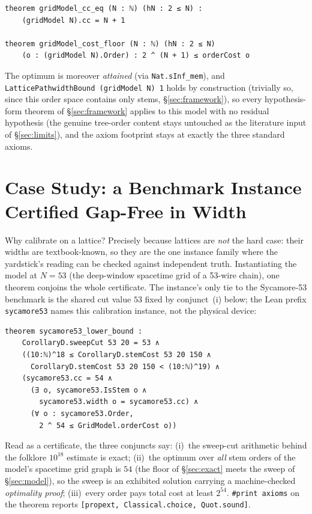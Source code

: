 \documentclass[sigplan,10pt,screen,review,anonymous]{acmart}
\begin{document}
\begin{lstlisting}
theorem gridModel_cc_eq (N : ℕ) (hN : 2 ≤ N) :
    (gridModel N).cc = N + 1

theorem gridModel_cost_floor (N : ℕ) (hN : 2 ≤ N)
    (o : (gridModel N).Order) : 2 ^ (N + 1) ≤ orderCost o
\end{lstlisting}

\noindent The optimum is moreover \emph{attained} (via \lstinline|Nat.sInf_mem|), and
\lstinline|LatticePathwidthBound (gridModel N) 1| holds by construction (trivially so,
since this order space contains only stems, \S\ref{sec:framework}), so every
hypothesis-form theorem of \S\ref{sec:framework} applies to this model with no residual
hypothesis (the genuine tree-order content stays untouched as the literature input of
\S\ref{sec:limits}), and the axiom footprint stays at exactly the three standard axioms.

\section{Case Study: a Benchmark Instance Certified Gap-Free in Width}\label{sec:endtoend}

Why calibrate on a lattice? Precisely because lattices are \emph{not} the hard case: their
widths are textbook-known, so they are the one instance family where the yardstick's reading
can be checked against independent truth. Instantiating the model at $N = 53$ (the
deep-window spacetime grid of a 53-wire chain), one theorem conjoins the whole certificate.
The instance's only tie to the Sycamore-53 benchmark is the shared cut value $53$ fixed by
conjunct~(i) below; the Lean prefix \lstinline|sycamore53| names this calibration instance,
not the physical device:

\begin{lstlisting}
theorem sycamore53_lower_bound :
    CorollaryD.sweepCut 53 20 = 53 ∧
    ((10:ℕ)^18 ≤ CorollaryD.stemCost 53 20 150 ∧
      CorollaryD.stemCost 53 20 150 < (10:ℕ)^19) ∧
    (sycamore53.cc = 54 ∧
      (∃ o, sycamore53.IsStem o ∧
        sycamore53.width o = sycamore53.cc) ∧
      (∀ o : sycamore53.Order,
        2 ^ 54 ≤ GridModel.orderCost o))
\end{lstlisting}

Read as a certificate, the three conjuncts say: (i)~the sweep-cut arithmetic behind the
folklore $10^{18}$ estimate is exact; (ii)~the optimum over \emph{all} stem orders of the
model's spacetime grid graph is $54$ (the floor of \S\ref{sec:exact} meets the sweep of
\S\ref{sec:model}), so the sweep is an exhibited solution carrying a machine-checked
\emph{optimality proof}; (iii)~every order pays total cost at least $2^{54}$.
\texttt{\#print axioms} on the theorem reports
\texttt{[propext, Classical.choice, Quot.sound]}.
\end{document}
